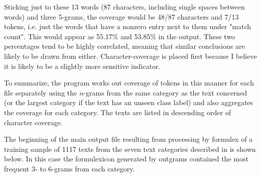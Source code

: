 \documentclass[output=paper]{langscibook}
\begin{document}
Sticking just to these 13 words (87 characters, including single spaces between words) and three 5-grams, the coverage would be 48/87 characters and 7/13 tokens, i.e. just the words that have a nonzero entry next to them under "match count". This would appear as 55.17\% and 53.85\% in the output. These two percentages tend to be highly correlated, meaning that similar conclusions are likely to be drawn from either. Character-coverage is placed first because I believe it is likely to be a slightly more sensitive indicator.

To summarize, the program works out coverage of tokens in this manner for each file separately using the $n$-grams from the same category as the text concerned (or the largest category if the text has an unseen class label) and also aggregates the coverage for each category. The texts are listed in descending order of character coverage.

The beginning of the main output file resulting from processing by formulex of a training sample of 1117 texts from the seven text categories described in  is shown below. In this case the formulexicon generated by outgrams contained the most frequent 3- to 6-grams from each category.
\end{document}
